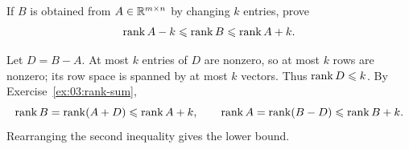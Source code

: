 \begin{problem}\label{ex:03:changed-entries}
If \(B\) is obtained from \(A\in\mathbb R^{m\times n}\) by changing \(k\)
entries, prove
\[
\operatorname{rank} A-k\leqslant\operatorname{rank} B\leqslant\operatorname{rank} A+k.
\]
\end{problem}
\begin{solution}
Let \(D=B-A\). At most \(k\) entries of \(D\) are nonzero, so at most
\(k\) rows are nonzero; its row space is spanned by at most \(k\) vectors.
Thus \(\operatorname{rank} D\leqslant k\).
By Exercise~\ref{ex:03:rank-sum},
\[
\operatorname{rank} B=\operatorname{rank}(A+D)\leqslant\operatorname{rank} A+k,
\qquad
\operatorname{rank} A=\operatorname{rank}(B-D)\leqslant\operatorname{rank} B+k.
\]
Rearranging the second inequality gives the lower bound.
\end{solution}
